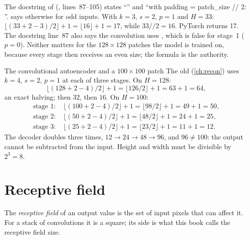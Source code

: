 \begin{sourcenote}[: ``H\_out = H\_in // stride'' holds only for even sizes]
The docstring of 
(, lines~87--105) states
``'' and ``with padding = patch\_size // 2:
''.  says otherwise for odd inputs. With $k=3$,
$s=2$, $p=1$ and $H=33$: $\lfloor(33+2-3)/2\rfloor+1 = \lfloor 16\rfloor + 1 = 17$, while
$33 /\!/ 2 = 16$. PyTorch returns 17\tagC. The docstring line~87 also says the convolution uses
, which is false for stage~1 ($p=0$). Neither matters for the $128\times128$
patches the model is trained on, because every stage then receives an even size; the formula is the
authority.
\end{sourcenote}

\begin{worked}[label={we:shapes:spatialenc}]{The convolutional autoencoder and a $100\times100$ patch}
The old  (\cref{ch:recon}) uses $k=4$, $s=2$, $p=1$ at each of three stages. On
$H=128$:
\[
\lfloor(128 + 2 - 4)/2\rfloor + 1 = \lfloor 126/2 \rfloor + 1 = 63 + 1 = 64,
\]
an exact halving; then $32$, then $16$. On $H = 100$:
\begin{align*}
\text{stage 1: } & \lfloor (100 + 2 - 4)/2 \rfloor + 1 = \lfloor 98/2 \rfloor + 1 = 49 + 1 = 50,\\
\text{stage 2: } & \lfloor (50 + 2 - 4)/2 \rfloor + 1 = \lfloor 48/2 \rfloor + 1 = 24 + 1 = 25,\\
\text{stage 3: } & \lfloor (25 + 2 - 4)/2 \rfloor + 1 = \lfloor 23/2\rfloor + 1 = 11 + 1 = 12.
\end{align*}
The decoder doubles three times, $12\to24\to48\to96$, and $96\ne100$: the output cannot be subtracted
from the input. Height and width must be divisible by $2^3 = 8$.
\end{worked}

\section{Receptive field}\label{sec:shapes:rf}

\begin{definition}
The \emph{receptive field} of an output value is the set of input pixels that can
affect it. For a stack of convolutions it is a square; its side is what this book calls the receptive
field size.
\end{definition}

